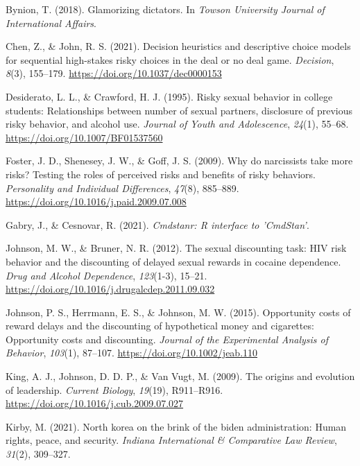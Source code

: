 \documentclass[
  donotrepeattitle,doc, 12pt, a4paper,floatsintext]{apa7}
\newlength{\cslhangindent}
\newlength{\cslentryspacingunit} %
\newenvironment{CSLReferences}[2] %
 {%
  \setlength{\parindent}{0pt}
  \ifodd #1
  \let\oldpar\par
  \def\par{\hangindent=\cslhangindent\oldpar}
  \fi
  \setlength{\parskip}{#2\cslentryspacingunit}
 }%
 {}
\begin{document}
\begin{CSLReferences}{1}{0}
\leavevmode{}%
Bynion, T. (2018). Glamorizing dictators. In \emph{Towson University Journal of International Affairs}.

\leavevmode{}%
Chen, Z., \& John, R. S. (2021). Decision heuristics and descriptive choice models for sequential high-stakes risky choices in the deal or no deal game. \emph{Decision}, \emph{8}(3), 155--179. \url{https://doi.org/10.1037/dec0000153}

\leavevmode{}%
Desiderato, L. L., \& Crawford, H. J. (1995). Risky sexual behavior in college students: Relationships between number of sexual partners, disclosure of previous risky behavior, and alcohol use. \emph{Journal of Youth and Adolescence}, \emph{24}(1), 55--68. \url{https://doi.org/10.1007/BF01537560}

\leavevmode{}%
Foster, J. D., Shenesey, J. W., \& Goff, J. S. (2009). Why do narcissists take more risks? {Testing} the roles of perceived risks and benefits of risky behaviors. \emph{Personality and Individual Differences}, \emph{47}(8), 885--889. \url{https://doi.org/10.1016/j.paid.2009.07.008}

\leavevmode{}%
Gabry, J., \& Cesnovar, R. (2021). \emph{Cmdstanr: {R} interface to '{CmdStan}'}.

\leavevmode{}%
Johnson, M. W., \& Bruner, N. R. (2012). The sexual discounting task: {HIV} risk behavior and the discounting of delayed sexual rewards in cocaine dependence. \emph{Drug and Alcohol Dependence}, \emph{123}(1-3), 15--21. \url{https://doi.org/10.1016/j.drugalcdep.2011.09.032}

\leavevmode{}%
Johnson, P. S., Herrmann, E. S., \& Johnson, M. W. (2015). Opportunity costs of reward delays and the discounting of hypothetical money and cigarettes: Opportunity costs and discounting. \emph{Journal of the Experimental Analysis of Behavior}, \emph{103}(1), 87--107. \url{https://doi.org/10.1002/jeab.110}

\leavevmode{}%
King, A. J., Johnson, D. D. P., \& Van Vugt, M. (2009). The origins and evolution of leadership. \emph{Current Biology}, \emph{19}(19), R911--R916. \url{https://doi.org/10.1016/j.cub.2009.07.027}

\leavevmode{}%
Kirby, M. (2021). North korea on the brink of the biden administration: Human rights, peace, and security. \emph{Indiana International \& Comparative Law Review}, \emph{31}(2), 309--327.


\end{CSLReferences}
\end{document}

